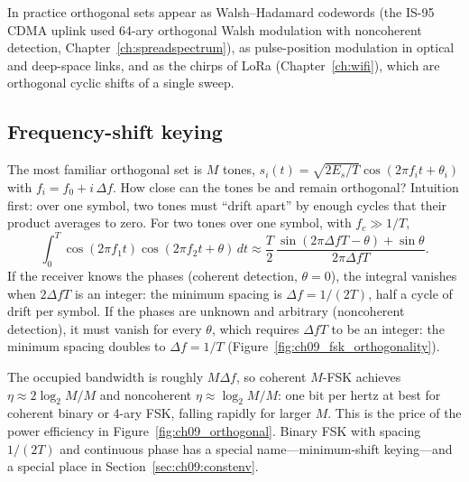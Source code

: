
In practice orthogonal sets appear as Walsh--Hadamard codewords (the IS-95 CDMA uplink used
64-ary orthogonal Walsh modulation with noncoherent detection, Chapter~\ref{ch:spreadspectrum}),
as pulse-position modulation in optical and deep-space links, and as the chirps of LoRa
(Chapter~\ref{ch:wifi}), which are orthogonal cyclic shifts of a single sweep.

\subsection{Frequency-shift keying}

The most familiar orthogonal set is $M$ tones,
$s_i(t)=\sqrt{2E_s/T}\cos(2\pi f_it+\theta_i)$ with $f_i=f_0+i\,\Delta f$. How close can the tones
be and remain orthogonal? Intuition first: over one symbol, two tones must ``drift apart'' by
enough cycles that their product averages to zero. For two tones over one symbol, with
$f_c\gg1/T$,
\begin{equation}
\int_0^T\cos(2\pi f_1t)\cos(2\pi f_2t+\theta)\,dt\approx
\frac{T}{2}\,\frac{\sin(2\pi\Delta fT-\theta)+\sin\theta}{2\pi\Delta fT}.
\end{equation}
If the receiver knows the phases (coherent detection, $\theta=0$), the integral vanishes when
$2\Delta fT$ is an integer: the minimum spacing is $\Delta f=1/(2T)$, half a cycle of drift per
symbol. If the phases are unknown and arbitrary (noncoherent detection), it must vanish for every
$\theta$, which requires $\Delta fT$ to be an integer: the minimum spacing doubles to
$\Delta f=1/T$ (Figure~\ref{fig:ch09_fsk_orthogonality}).


The occupied bandwidth is roughly $M\Delta f$, so coherent $M$-FSK achieves
$\eta\approx2\log_2M/M$ and noncoherent $\eta\approx\log_2M/M$: one bit per hertz at best for
coherent binary or 4-ary FSK, falling rapidly for larger $M$. This is the price of the power
efficiency in Figure~\ref{fig:ch09_orthogonal}. Binary FSK with spacing $1/(2T)$ and continuous
phase has a special name---minimum-shift keying---and a special place in
Section~\ref{sec:ch09:constenv}.


